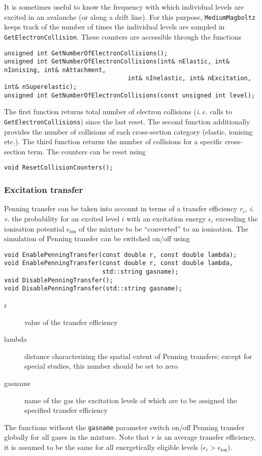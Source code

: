 It is sometimes useful to know the frequency with which individual levels 
are excited in an avalanche (or along a drift line). 
For this purpose, \texttt{MediumMagboltz} keeps track of the number of times 
the individual levels are sampled in \texttt{GetElectronCollision}. 
These counters are accessible through the functions
\begin{lstlisting}
unsigned int GetNumberOfElectronCollisions();
unsigned int GetNumberOfElectronCollisions(int& nElastic, int& nIonising, int& nAttachment,
                                  int& nInelastic, int& nExcitation, int& nSuperelastic);
unsigned int GetNumberOfElectronCollisions(const unsigned int level);
\end{lstlisting}
The first function returns total number of electron collisions (\textit{i.\,e.} calls 
to \texttt{GetElectronCollisions}) since the last reset. 
The second function additionally provides the number of collisions of each 
cross-section category (elastic, ionising etc.). 
The third function returns the number of collisions for a specific cross-section term.
The counters can be reset using
\begin{lstlisting}
void ResetCollisionCounters();
\end{lstlisting} 

\subsubsection{Excitation transfer}\label{Sec:PenningTransfer}

Penning transfer can be taken into account in terms of a transfer efficiency 
\(r_{i}\), \textit{i.\,e.} the probability for an excited level \(i\) with an  
excitation energy \(\epsilon_{i}\) exceeding the ionisation potential 
\(\epsilon_{\text{ion}}\) of the mixture to 
be ``converted'' to an ionisation.
The simulation of Penning transfer can be switched on/off using
\begin{lstlisting}
void EnablePenningTransfer(const double r, const double lambda);
void EnablePenningTransfer(const double r, const double lambda, 
                           std::string gasname);
void DisablePenningTransfer();
void DisablePenningTransfer(std::string gasname);
\end{lstlisting}
\begin{description}
  \item[r] value of the transfer efficiency
  \item[lambda] distance characterizing the spatial extent of Penning transfers; 
                except for special studies, this number should be set to zero
  \item[gasname] name of the gas the excitation levels of which are to be assigned 
                 the specified transfer efficiency 
\end{description}
The functions without the \texttt{gasname} parameter
switch on/off Penning transfer globally for all gases in the mixture. 
Note that \(r\) is an average transfer efficiency, it is assumed to be the same 
for all energetically eligible levels (\(\epsilon_{i} > \epsilon_{\text{ion}}\)).

